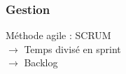 \begin{frame}
\frametitle{Gestion}
Méthode agile : SCRUM\\
$\rightarrow$ Temps divisé en sprint\\
$\rightarrow$ Backlog
\end{frame}
